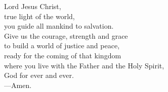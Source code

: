 \prayer


\begin{prayerverse}
Lord Jesus Christ,\\
true light of the world,\\
you guide all mankind to salvation.\\
Give us the courage, strength and grace\\
to build a world of justice and peace,\\
ready for the coming of that kingdom\\
where you live with the Father and the Holy Spirit,\\
God for ever and ever.\\
{\color{red}---\thinspace}Amen.
\end{prayerverse}

